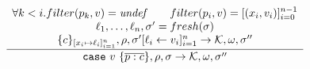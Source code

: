 \begin{figure}
  $$
    \begin{array}{c}
      \cfrac{
        \begin{array}{c}
        \forall k<i. filter(p_k,v)={\mathit{undef}} \qquad filter(p_i,v)= [(x_i,v_i)]_{i=0}^{n-1} \\
        \ell_1,\ldots,\ell_n,\sigma' = fresh(\sigma)      \\
          \{c\}_{[x_i \mapsto \ell_i]_{i=1}^{n}}, \env, \heap'[\ell_i \leftarrow v_i]_{i=1}^{n}
          \rightarrow \mathcal{K},\omega,\heap''  
        \end{array}
      }{
        {\tt{case}}~v~\{\overline{p:c}\}, \env ,\heap \rightarrow \mathcal{K}, \omega , \heap''
      }
      \\\\

\end{array}$$
\end{figure}
